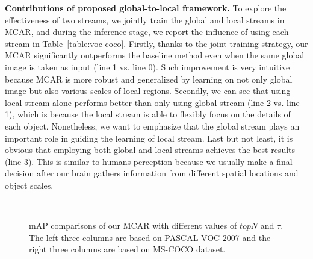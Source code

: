 \documentclass[journal]{IEEEtran}
\begin{document}
\noindent \textbf{Contributions of proposed global-to-local framework.}  
To explore the effectiveness of two streams, we jointly train the global and local streams in MCAR, and during the inference stage, we report the influence of using each stream in Table~\ref{table:voc-coco}. Firstly, thanks to the joint training strategy, our MCAR significantly outperforms the baseline method even when the same global image is taken as input (line 1 vs. line 0). Such improvement is very intuitive because MCAR is more robust and generalized by learning on not only global image but also various scales of local regions. Secondly, we can see that using local stream alone performs better than only using global stream (line 2 vs. line 1), which is because the local stream is able to flexibly focus on the details of each object. Nonetheless, we want to emphasize that the global stream plays an important role in guiding the learning of local stream. Last but not least, it is obvious that employing both global and local streams achieves the best results (line 3). This is similar to humans perception because we usually make a final decision after our brain gathers information from different spatial locations and object scales.

\begin{figure*}[t]
 \centering
 \vspace{-5pt}
 \quad \vrule \quad
  \\
  	\quad \vrule \quad
\caption{mAP comparisons of our MCAR with different values of  $topN$ and $\tau$. The left three columns are based on PASCAL-VOC 2007 and the right three columns are based on MS-COCO dataset.} \label{fig:hyperpa}
\vspace{-10pt}\label{fig:topntao}
\end{figure*}
\end{document}
